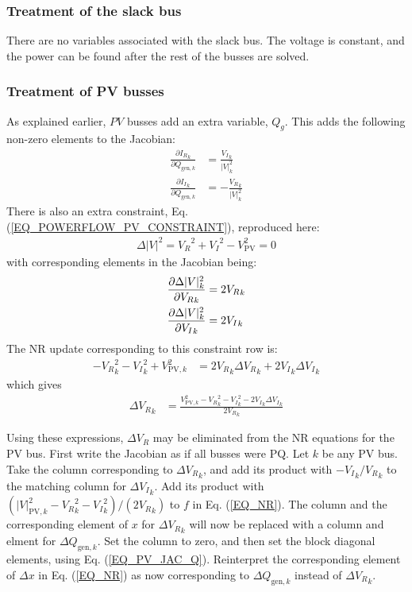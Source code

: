 \documentclass[11pt]{article}
\newcommand{\Vr}{{V_R}}
\newcommand{\Vi}{{V_I}}
\newcommand{\Ir}{{I_R}}
\newcommand{\Ii}{{I_I}}
\begin{document}
\subsubsection{Treatment of the slack bus}
There are no variables associated with the slack bus. The voltage is constant, and the power can be found after the rest of the busses are solved.

\subsubsection{Treatment of PV busses}
As explained earlier, $PV$ busses add an extra variable, $Q_g$. This adds the following non-zero elements to the Jacobian:
\begin{align}
\frac{\partial \Ir_k}{\partial Q_{\text{gen},k}} &= \frac{\Vi_k}{|V|_k^2} \\
\frac{\partial \Ii_k}{\partial Q_{\text{gen},k}} &= -\frac{\Vr_k}{|V|_k^2}
\end{align}
There is also an extra constraint, Eq. (\ref{EQ_POWERFLOW_PV_CONSTRAINT}), reproduced here:
\begin{align}
\Delta |V|^2 = \Vr^2 + \Vi^2 - V_\text{PV}^2 = 0
\label{EQ_POWERFLOW_PV_CONSTRAINT_AGAIN}
\end{align}
with corresponding elements in the Jacobian being:
\begin{align}
\frac{\partial \Delta|V|^2_k}{\partial \Vr_k} &= 2 \Vr_k \notag \\
\frac{\partial \Delta|V|^2_k}{\partial \Vi_k} &= 2 \Vi_k
\label{EQ_PV_JAC_Q}
\end{align}
The NR update corresponding to this constraint row is:
\begin{align}
	-\Vr_k^2 - \Vi_k^2 + V_{\text{PV},k}^2 &= 2\Vr_k\Delta\Vr_k + 2\Vi_k\Delta\Vi_k
\end{align}
which gives
\begin{align}
\Delta \Vr_k &= \frac{V^2_{\text{PV},k} - \Vr_k^2 - \Vi_k^2- 2\Vi_k\Delta \Vi_k}{2\Vr_k}
\end{align}

Using these expressions, $\Delta \Vr$ may be eliminated from the NR equations for the PV bus. First write the Jacobian as if all busses were PQ. Let $k$ be any PV bus. Take the column corresponding to $\Delta \Vr_k$, and add its product with $-\Vi_k/\Vr_k$ to the matching column for  $\Delta \Vi_k$. Add its product with $(|V|^2_{\text{PV},k} - \Vr_k^2 - \Vi_k^2)/(2\Vr_k)$ to $f$ in Eq. (\ref{EQ_NR}). The column and the corresponding element of $x$ for $\Delta \Vr_k$ will now be replaced with a column and elment for $\Delta Q_{\text{gen},k}$. Set the column to zero, and then set the block diagonal elements, using Eq. (\ref{EQ_PV_JAC_Q}). Reinterpret the corresponding element of $\Delta x$ in Eq. (\ref{EQ_NR}) as now corresponding to $\Delta Q_{\text{gen},k}$ instead of $\Delta \Vr_k$.
\end{document}
